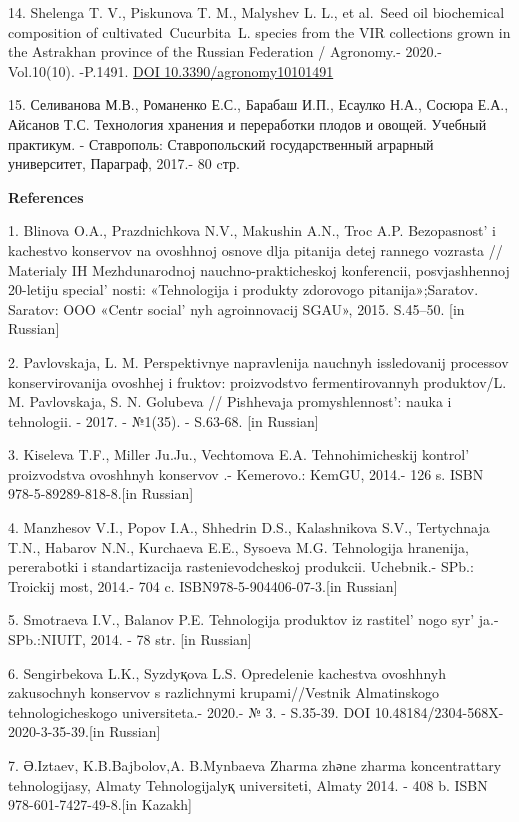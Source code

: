 14. Shelenga T. V., Piskunova T. M., Malyshev L. L., et al.~Seed oil
biochemical composition of cultivated~Cucurbita~L. species from the VIR
collections grown in the Astrakhan province of the Russian Federation /
Agronomy.- 2020.- Vol.10(10). -P.1491.
\href{https://doi.org/10.3390/agronomy10101491}{DOI
10.3390/agronomy10101491}

15. Селиванова М.В., Романенко Е.С., Барабаш И.П., Есаулко Н.А., Сосюра
Е.А., Айсанов Т.С. Технология хранения и переработки плодов и овощей.
Учебный практикум. - Ставрополь: Ставропольский государственный аграрный
университет, Параграф, 2017.- 80 cтр.

{\bfseries References}

1. Blinova O.A., Prazdnichkova N.V., Makushin A.N., Troc A.P.
Bezopasnost'{} i kachestvo konservov na ovoshhnoj osnove
dlja pitanija detej rannego vozrasta // Materialy IH Mezhdunarodnoj
nauchno-prakticheskoj konferencii, posvjashhennoj 20-letiju
special' nosti: «Tehnologija i produkty zdorovogo
pitanija»;Saratov. Saratov: OOO «Centr social' nyh
agroinnovacij SGAU», 2015. S.45--50. {[}in Russian{]}

2. Pavlovskaja, L. M. Perspektivnye napravlenija nauchnyh issledovanij
processov konservirovanija ovoshhej i fruktov: proizvodstvo
fermentirovannyh produktov/L. M. Pavlovskaja, S. N. Golubeva //
Pishhevaja promyshlennost': nauka i tehnologii. - 2017. -
№1(35). - S.63-68. {[}in Russian{]}

3. Kiseleva T.F., Miller Ju.Ju., Vechtomova E.A. Tehnohimicheskij
kontrol'{} proizvodstva ovoshhnyh konservov .- Kemerovo.:
KemGU, 2014.- 126 s. ISBN 978-5-89289-818-8.{[}in Russian{]}

4. Manzhesov V.I., Popov I.A., Shhedrin D.S., Kalashnikova S.V.,
Tertychnaja T.N., Habarov N.N., Kurchaeva E.E., Sysoeva M.G. Tehnologija
hranenija, pererabotki i standartizacija rastenievodcheskoj produkcii.
Uchebnik.- SPb.: Troickij most, 2014.- 704 c.
ISBN978-5-904406-07-3.{[}in Russian{]}

5. Smotraeva I.V., Balanov P.E. Tehnologija produktov iz
rastitel' nogo syr' ja.- SPb.:NIUIT,
2014. - 78 str. {[}in Russian{]}

6. Sengirbekova L.K., Syzdyқova L.S. Opredelenie kachestva ovoshhnyh
zakusochnyh konservov s razlichnymi krupami//Vestnik Almatinskogo
tehnologicheskogo universiteta.- 2020.- № 3. - S.35-39. DOI
10.48184/2304-568X-2020-3-35-39.{[}in Russian{]}

7. Ә.Іztaev, K.B.Bajbolov,A. B.Mynbaeva Zharma zhәne zharma
koncentrattary tehnologijasy, Almaty Tehnologijalyқ universitetі, Almaty
2014. - 408 b. ISBN 978-601-7427-49-8.{[}in Kazakh{]}

